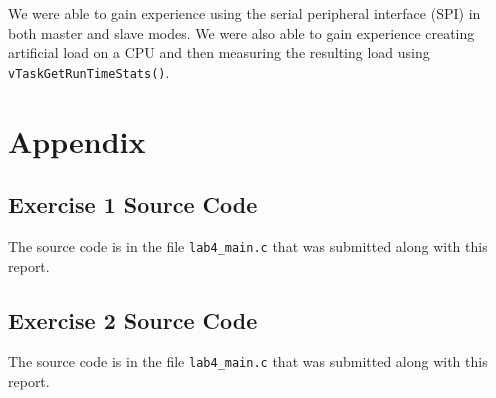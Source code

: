\documentclass[11pt, letterpaper, titlepage]{article}
\begin{document}
We were able to gain experience using the serial peripheral interface (SPI) in both master and slave modes. We were also able to gain experience creating artificial load on a CPU and then measuring the resulting load using \texttt{vTaskGetRunTimeStats()}.

\section{Appendix}

\subsection{Exercise 1 Source Code}
The source code is in the file \texttt{lab4_main.c} that was submitted along with this report.

\subsection{Exercise 2 Source Code}
The source code is in the file \texttt{lab4_main.c} that was submitted along with this report.
\end{document}
